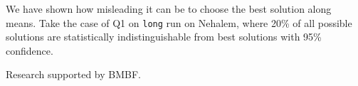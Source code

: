 \documentclass{sig-alternate}
\begin{document}
We have shown how misleading it can be to choose the best solution along means. Take the case of Q1 on \texttt{long} run on Nehalem, where 20\% of all possible solutions are statistically indistinguishable from best solutions with 95\% confidence.

 Research supported by BMBF.

\balance

\vspace{-5pt}

\scriptsize


\end{document}
